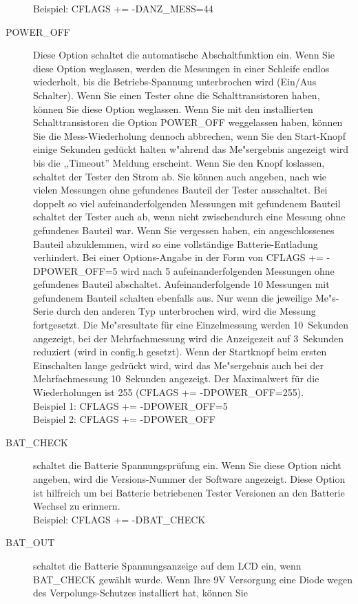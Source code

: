 \begin{description}
Beispiel: CFLAGS += -DANZ\_MESS=44
  \item[POWER\_OFF] Diese Option schaltet die automatische Abschaltfunktion ein.
Wenn Sie diese Option weglassen, werden die Messungen in einer Schleife endlos wiederholt, bis die Betriebs-Spannung 
unterbrochen wird (Ein/Aus Schalter).
Wenn Sie einen Tester ohne die Schalttransistoren haben, k\"onnen Sie diese Option weglassen.
Wenn Sie mit den installierten Schalttransistoren die Option POWER\_OFF weggelassen haben,
k\"onnen Sie die Mess-Wiederholung dennoch abbrechen, wenn Sie den Start-Knopf einige Sekunden ged\"uckt halten 
w"ahrend das Me"sergebnis angezeigt wird bis die ,,Timeout'' Meldung erscheint.
Wenn Sie den Knopf loslassen, schaltet der Tester den Strom ab.
Sie k\"onnen auch angeben, nach wie vielen Messungen ohne gefundenes Bauteil der Tester ausschaltet.
Bei doppelt so viel aufeinanderfolgenden Messungen mit gefundenem Bauteil schaltet der Tester auch ab,
wenn nicht zwischendurch eine Messung ohne gefundenes Bauteil war.
Wenn Sie vergessen haben, ein angeschlossenes Bauteil abzuklemmen, wird so eine vollst\"andige Batterie-Entladung
verhindert.
Bei einer Options-Angabe in der Form von CFLAGS += -DPOWER\_OFF=5 wird nach 5 aufeinanderfolgenden Messungen ohne
gefundenes Bauteil abschaltet. Aufeinanderfolgende 10 Messungen mit gefundenem Bauteil schalten ebenfalls aus.
Nur wenn die jeweilige Me"s-Serie durch den anderen Typ unterbrochen wird, wird die Messung fortgesetzt.
Die Me"sresultate f\"ur eine Einzelmessung werden 10~Sekunden angezeigt, bei der Mehrfachmessung wird die
Anzeigezeit auf 3~Sekunden reduziert (wird in config.h gesetzt).
Wenn der Startknopf beim ersten Einschalten lange gedr\"uckt wird, wird das Me"sergebnis
 auch bei der Mehrfachmessung 10~Sekunden angezeigt.
Der Maximalwert f\"ur die Wiederholungen ist 255 (CFLAGS += -DPOWER\_OFF=255).\\
Beispiel 1: CFLAGS += -DPOWER\_OFF=5 \\
Beispiel 2: CFLAGS += -DPOWER\_OFF 
  \item[BAT\_CHECK] schaltet die Batterie Spannungspr\"ufung ein.
 Wenn Sie diese Option nicht angeben, wird die Versions-Nummer der Software angezeigt.
Diese Option ist hilfreich um bei Batterie betriebenen Tester Versionen an den Batterie Wechsel zu erinnern.\\
Beispiel: CFLAGS += -DBAT\_CHECK
  \item[BAT\_OUT] schaltet die Batterie Spannungsanzeige auf dem LCD ein, wenn BAT\_CHECK gew\"ahlt wurde.
 Wenn Ihre 9V Versorgung eine Diode wegen des Verpolungs-Schutzes installiert hat, k\"onnen Sie 

\end{description}
